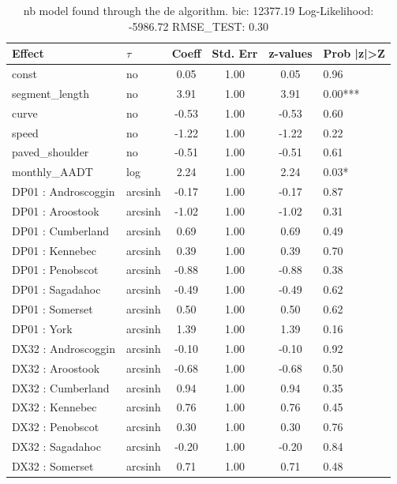 \begin{table}
	\caption{nb model found through the de algorithm. bic: 12377.19 Log-Likelihood: -5986.72 RMSE_TEST: 0.30}
	\begin{center}
		\begin{tabular}{|l|l|c|c|c|l|}
			\hline
			Effect & $\tau$ & Coeff & Std. Err & z-values & Prob |z|>Z \\
			\hline
			const & no & 0.05 & 1.00 & 0.05 & 0.96 \\
			\hline
			segment_length & no & 3.91 & 1.00 & 3.91 & 0.00*** \\
			\hline
			curve & no & -0.53 & 1.00 & -0.53 & 0.60 \\
			\hline
			speed & no & -1.22 & 1.00 & -1.22 & 0.22 \\
			\hline
			paved_shoulder & no & -0.51 & 1.00 & -0.51 & 0.61 \\
			\hline
			monthly_AADT & log & 2.24 & 1.00 & 2.24 & 0.03* \\
			\hline
			DP01 : Androscoggin & arcsinh & -0.17 & 1.00 & -0.17 & 0.87 \\
			\hline
			DP01 : Aroostook & arcsinh & -1.02 & 1.00 & -1.02 & 0.31 \\
			\hline
			DP01 : Cumberland & arcsinh & 0.69 & 1.00 & 0.69 & 0.49 \\
			\hline
			DP01 : Kennebec & arcsinh & 0.39 & 1.00 & 0.39 & 0.70 \\
			\hline
			DP01 : Penobscot & arcsinh & -0.88 & 1.00 & -0.88 & 0.38 \\
			\hline
			DP01 : Sagadahoc & arcsinh & -0.49 & 1.00 & -0.49 & 0.62 \\
			\hline
			DP01 : Somerset & arcsinh & 0.50 & 1.00 & 0.50 & 0.62 \\
			\hline
			DP01 : York & arcsinh & 1.39 & 1.00 & 1.39 & 0.16 \\
			\hline
			DX32 : Androscoggin & arcsinh & -0.10 & 1.00 & -0.10 & 0.92 \\
			\hline
			DX32 : Aroostook & arcsinh & -0.68 & 1.00 & -0.68 & 0.50 \\
			\hline
			DX32 : Cumberland & arcsinh & 0.94 & 1.00 & 0.94 & 0.35 \\
			\hline
			DX32 : Kennebec & arcsinh & 0.76 & 1.00 & 0.76 & 0.45 \\
			\hline
			DX32 : Penobscot & arcsinh & 0.30 & 1.00 & 0.30 & 0.76 \\
			\hline
			DX32 : Sagadahoc & arcsinh & -0.20 & 1.00 & -0.20 & 0.84 \\
			\hline
			DX32 : Somerset & arcsinh & 0.71 & 1.00 & 0.71 & 0.48 \\

\end{tabular}
\end{center}
\end{table}

